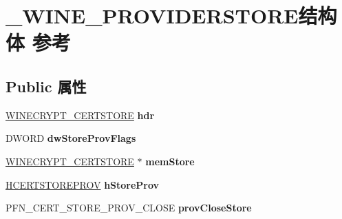 \hypertarget{struct___w_i_n_e___p_r_o_v_i_d_e_r_s_t_o_r_e}{}\section{\+\_\+\+W\+I\+N\+E\+\_\+\+P\+R\+O\+V\+I\+D\+E\+R\+S\+T\+O\+R\+E结构体 参考}
\label{struct___w_i_n_e___p_r_o_v_i_d_e_r_s_t_o_r_e}
\subsection*{Public 属性}
\begin{DoxyCompactItemize}
\item 
\mbox{\label{struct___w_i_n_e___p_r_o_v_i_d_e_r_s_t_o_r_e_a2019afc72e4085094edf10449936e9ae}} 
\hyperlink{struct_w_i_n_e___c_r_y_p_t_c_e_r_t_s_t_o_r_e}{W\+I\+N\+E\+C\+R\+Y\+P\+T\+\_\+\+C\+E\+R\+T\+S\+T\+O\+RE} {\bfseries hdr}
\item 
\mbox{\label{struct___w_i_n_e___p_r_o_v_i_d_e_r_s_t_o_r_e_ad07406995b1d9c887a22481de83d85ed}} 
D\+W\+O\+RD {\bfseries dw\+Store\+Prov\+Flags}
\item 
\mbox{\label{struct___w_i_n_e___p_r_o_v_i_d_e_r_s_t_o_r_e_a69446f7157054f6a9fb59cb8b72e475f}} 
\hyperlink{struct_w_i_n_e___c_r_y_p_t_c_e_r_t_s_t_o_r_e}{W\+I\+N\+E\+C\+R\+Y\+P\+T\+\_\+\+C\+E\+R\+T\+S\+T\+O\+RE} $\ast$ {\bfseries mem\+Store}
\item 
\mbox{\label{struct___w_i_n_e___p_r_o_v_i_d_e_r_s_t_o_r_e_a4c92d860827855e6d43350b6d3f2ad05}} 
\hyperlink{interfacevoid}{H\+C\+E\+R\+T\+S\+T\+O\+R\+E\+P\+R\+OV} {\bfseries h\+Store\+Prov}
\item 
\mbox{\label{struct___w_i_n_e___p_r_o_v_i_d_e_r_s_t_o_r_e_a2c73842eaa39a74bd99e6d5a92552e1f}} 
P\+F\+N\+\_\+\+C\+E\+R\+T\+\_\+\+S\+T\+O\+R\+E\+\_\+\+P\+R\+O\+V\+\_\+\+C\+L\+O\+SE {\bfseries prov\+Close\+Store}
\item 
\mbox{\label{struct___w_i_n_e___p_r_o_v_i_d_e_r_s_t_o_r_e_a7402c9f1db346f00224ec74bf2cf1838}} 

\end{DoxyCompactItemize}
